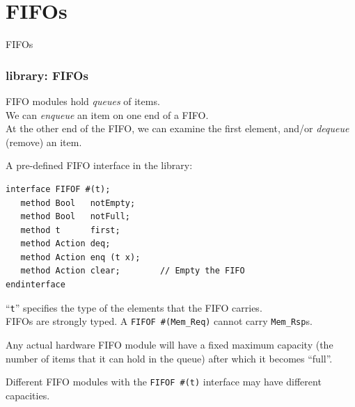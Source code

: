 \section{FIFOs}


\begin{frame}

\begin{center}
  {\LARGE FIFOs}
\end{center}

\end{frame}


\begin{frame}[fragile]
\frametitle{{\BSV} library: FIFOs}

\footnotesize

FIFO modules hold \emph{queues} of items. \\
We can \emph{enqueue} an item on one end of a FIFO. \\
At the other end of the FIFO, we can examine the first element, and/or
\emph{dequeue} (remove) an item.

\PAUSE{\vspace{2ex}}

A pre-defined FIFO interface in the {\BSV} library:
\begin{Verbatim}[frame=single]
interface FIFOF #(t);
   method Bool   notEmpty;
   method Bool   notFull;
   method t      first;
   method Action deq;
   method Action enq (t x);
   method Action clear;        // Empty the FIFO
endinterface
\end{Verbatim}

``{\tt t}'' specifies the type of the elements that the FIFO carries. \\
{\BSV} FIFOs are strongly typed.  A \verb|FIFOF #(Mem_Req)| cannot carry \verb|Mem_Rsp|s.

\PAUSE{\vspace{2ex}}

Any actual hardware FIFO module will have a fixed maximum
capacity (the number of items that it can hold in the queue) after
which it becomes ``full''.

\vspace{1ex}

Different FIFO modules with the \verb|FIFOF #(t)| interface may have
different capacities.

\end{frame}

